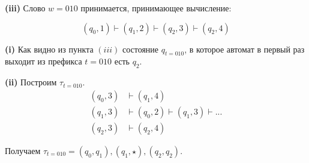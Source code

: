 \documentclass[10pt]{article}
\begin{document}
\smallskip

{\bf (iii)}
Слово $w = 010$ принимается, принимающее вычисление:

$$
  (q_0, 1) \vdash (q_1, 2) \vdash (q_2, 3) \vdash (q_2, 4)
$$

\smallskip

{\bf (i)}
Как видно из пункта $(iii)$ состояние $q_{t=010}$, в которое автомат в первый раз выходит из префикса $t = 010$ есть $q_2$.

\smallskip

{\bf (ii)}
Построим $\tau_{t = 010}$.
\begin{align*}
  (q_0, 3) &\vdash (q_1, 4) \\
  (q_1, 3) &\vdash (q_0, 2) \vdash (q_1, 3) \vdash ... \\
  (q_2, 3) &\vdash (q_2, 4)
\end{align*}

Получаем $\tau_{t = 010} = (q_0, q_1), (q_1, \star), (q_2, q_2)$.
\end{document}
